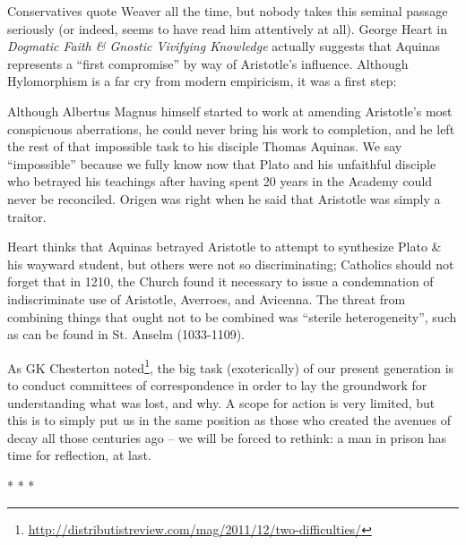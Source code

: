 Conservatives quote Weaver all the time, but nobody takes this seminal passage seriously (or indeed, seems to have read him attentively at all). George Heart in \emph{Dogmatic Faith \& Gnostic Vivifying Knowledge} actually suggests that Aquinas represents a ``first compromise'' by way of Aristotle's influence. Although Hylomorphism is a far cry from modern empiricism, it was a first step:

\begin{quotex}
Although Albertus Magnus himself started to work at amending Aristotle's most conspicuous aberrations, he could never bring his work to completion, and he left the rest of that impossible task to his disciple Thomas Aquinas. We say ``impossible'' because we fully know now that Plato and his unfaithful disciple who betrayed his teachings after having spent 20 years in the Academy could never be reconciled. Origen was right when he said that Aristotle was simply a traitor.

\end{quotex}
Heart thinks that Aquinas betrayed Aristotle to attempt to synthesize Plato \& his wayward student, but others were not so discriminating; Catholics should not forget that in 1210, the Church found it necessary to issue a condemnation of indiscriminate use of Aristotle, Averroes, and Avicenna. The threat from combining things that ought not to be combined was ``sterile heterogeneity'', such as can be found in St. Anselm (1033-1109).

As GK Chesterton noted\footnote{\url{http://distributistreview.com/mag/2011/12/two-difficulties/}}, the big task (exoterically) of our present generation is to conduct committees of correspondence in order to lay the groundwork for understanding what was lost, and why. A scope for action is very limited, but this is to simply put us in the same position as those who created the avenues of decay all those centuries ago – we will be forced to rethink: a man in prison has time for reflection, at last.




\begin{center}* * *\end{center}

